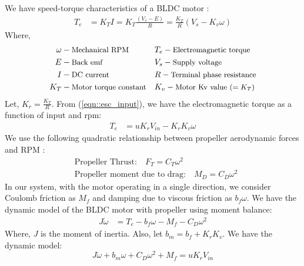 We have speed-torque characteristics of a BLDC motor \cite{crowder2019electric}:
\begin{align}
    T_e &= K_T I = K_T \frac{(V_s - E)}{R} = \frac{K_T}{R} (V_s - K_v \omega)
\end{align}
Where,
\begin{align*}
    \small
    \omega &- \text{\small Mechanical RPM} & &
    T_e      - \text{\small Electromagnetic torque}\\
    E        &- \text{\small Back emf} & &
    V_s      - \text{\small Supply voltage}\\
    I        &- \text{\small DC current}& &
    R        - \text{\small Terminal phase resistance}\\
    K_T      &- \text{\small Motor torque constant} & &
    K_v      - \text{\small Motor Kv value $(=K_T)$}
\end{align*}
Let, $K_r = \frac{K_T}{R}$.
From (\ref{eqn::esc_input}), we have the electromagnetic torque as a function
of input and rpm:
\begin{align}\label{eqn::Te}
    T_e &= u K_r V_{in} - K_r K_v \omega
\end{align}
We use the following quadratic relationship between propeller aerodynamic forces
and RPM \cite{pounds2010modelling}:
\begin{align}
    &\text{Propeller Thrust:}\quad
    F_T = C_{T} \omega^2\\
    &\text{Propeller moment due to drag:}\quad
    M_D = C_{D} \omega^2
\end{align}
In our system, with the motor operating in a single direction, we consider
Coulomb friction as $M_f$ and damping due to viscous friction as $b_f\omega$.
We have the dynamic model of the BLDC motor with propeller using moment balance:
\begin{align}
    J \dot \omega &= T_e - b_f \omega - M_f - C_D \omega^2
\end{align}
Where, $J$ is the moment of inertia. Also, let $b_m = b_f + K_rK_v$. We have the dynamic model:
\begin{equation}\label{eqn:dyn_mdl}
    J\dot \omega + b_m \omega + C_D \omega^2 + M_f = u K_r V_{in}
\end{equation}




